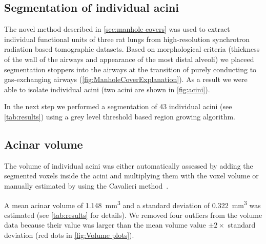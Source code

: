 \documentclass[paper=a4,twocolumn=true,DIV=calc,abstract,english]{scrartcl}
\newcommand{\numberofacini}{43\xspace}
\newcommand{\biggerthan}{2\xspace} %
\newcommand{\meanacinarvolume}{1.148} %
\newcommand{\meanacinarvolumeSTD}{0.322} %
\begin{document}
\subsection{Segmentation of individual acini}
The novel method described in \autoref{sec:manhole covers} was used to extract individual functional units of three rat lungs from high-resolution synchrotron radiation based tomographic datasets.
Based on morphological criteria (thickness of the wall of the airways and appearance of the most distal alveoli) we placeed segmentation stoppers into the airways at the transition of purely conducting to gas-exchanging airways (\autoref{fig:ManholeCoverExplanation}).
As a result we were able to isolate individual acini (two acini are shown in \autoref{fig:acini}).

In the next step we performed a segmentation of \numberofacini individual acini (see \autoref{tab:results}) using a grey level threshold based region growing algorithm.

\subsection{Acinar volume}
The volume of individual acini was either automatically assessed by adding the segmented voxels inside the acini and multiplying them with the voxel volume or manually estimated by using the Cavalieri method~\citep{Cruz-Orive1999}.

A mean acinar volume of \SI{\meanacinarvolume}{\milli\meter\cubed} and a standard deviation of \SI{\meanacinarvolumeSTD}{\milli\meter\cubed} was estimated (see \autoref{tab:results} for details).
We removed four outliers from the volume data because their value was larger than the mean volume value \(\pm\biggerthan\times\) standard deviation (red dots in \autoref{fig:Volume plots}).
\end{document}
